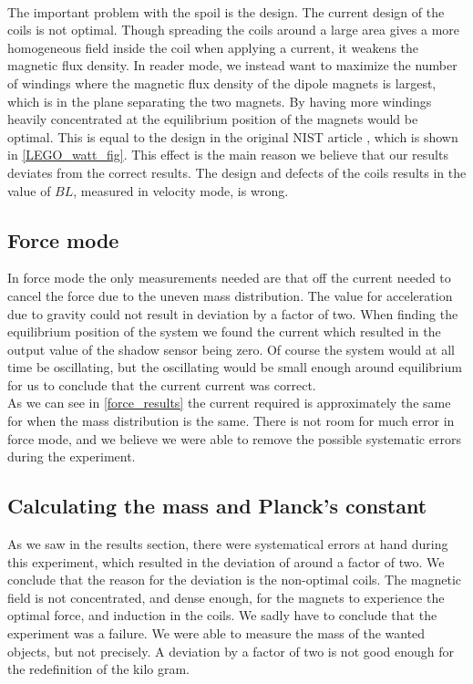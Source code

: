 \documentclass[english,a4paper,12pt,reprint]{revtex4-1}
\begin{document}
\\The important problem with the spoil is the design.
The current design of the coils is not optimal. Though spreading the coils around a large area gives a more homogeneous field inside the coil when applying a current, it weakens the magnetic flux density. In reader mode, we instead want to maximize the number of windings where the magnetic flux density of the dipole magnets is largest, which is in the plane separating the two magnets. By having more windings heavily concentrated at the equilibrium position of the magnets would be optimal. This is equal to the design in the original NIST article \cite{chao_lego_2015}, which is shown in \vref{LEGO_watt_fig}. This effect is the main reason we believe that our results deviates from the correct results. The design and defects of the coils results in the value of $BL$, measured in velocity mode, is wrong.
\subsection{Force mode}
In force mode the only measurements needed are that off the current needed to cancel the force due to the uneven mass distribution. The value for acceleration due to gravity could not result in deviation by a factor of two. When finding the equilibrium position of the system we found the current which resulted in the output value of the shadow sensor being zero. Of course the system would at all time be oscillating, but the oscillating would be small enough around equilibrium for us to conclude that the current current was correct.\\
As we can see in \vref{force_results} the current required is approximately the same for when the mass distribution is the same. There is not room for much error in force mode, and we believe we were able to remove the possible systematic errors during the experiment.
\subsection{Calculating the mass and Planck's constant}
As we saw in the results section, there were systematical errors at hand during this experiment, which resulted in the deviation of around a factor of two. We conclude that the reason for the deviation is the non-optimal coils. The magnetic field is not concentrated, and dense enough, for the magnets to experience the optimal force, and induction in the coils. We sadly have to conclude that the experiment was a failure. We were able to measure the mass of the wanted objects, but not precisely. A deviation by a factor of two is not good enough for the redefinition of the kilo gram.
\end{document}
